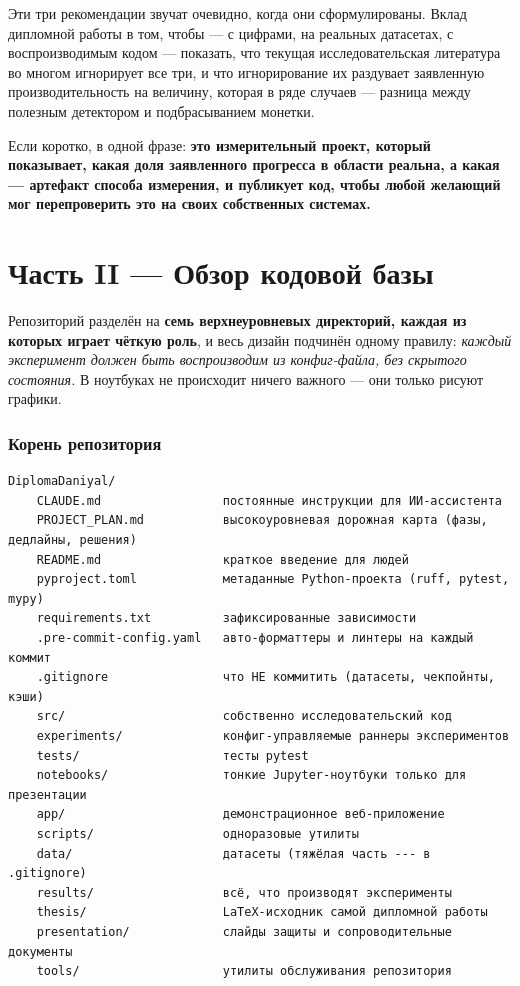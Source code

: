 \documentclass[11pt,a4paper]{article}
\begin{document}
Эти три рекомендации звучат очевидно, когда они сформулированы. Вклад дипломной работы в том, чтобы --- с цифрами, на реальных датасетах, с воспроизводимым кодом --- показать, что текущая исследовательская литература во многом игнорирует все три, и что игнорирование их раздувает заявленную производительность на величину, которая в ряде случаев --- разница между полезным детектором и подбрасыванием монетки.

Если коротко, в одной фразе: \textbf{это измерительный проект, который показывает, какая доля заявленного прогресса в области реальна, а какая --- артефакт способа измерения, и публикует код, чтобы любой желающий мог перепроверить это на своих собственных системах.}

\clearpage

\part*{Часть II --- Обзор кодовой базы}

Репозиторий разделён на \textbf{семь верхнеуровневых директорий, каждая из которых играет чёткую роль}, и весь дизайн подчинён одному правилу: \emph{каждый эксперимент должен быть воспроизводим из конфиг-файла, без скрытого состояния.} В ноутбуках не происходит ничего важного --- они только рисуют графики.

\section{Корень репозитория}

\begin{Verbatim}
DiplomaDaniyal/
    CLAUDE.md                 постоянные инструкции для ИИ-ассистента
    PROJECT_PLAN.md           высокоуровневая дорожная карта (фазы, дедлайны, решения)
    README.md                 краткое введение для людей
    pyproject.toml            метаданные Python-проекта (ruff, pytest, mypy)
    requirements.txt          зафиксированные зависимости
    .pre-commit-config.yaml   авто-форматтеры и линтеры на каждый коммит
    .gitignore                что НЕ коммитить (датасеты, чекпойнты, кэши)
    src/                      собственно исследовательский код
    experiments/              конфиг-управляемые раннеры экспериментов
    tests/                    тесты pytest
    notebooks/                тонкие Jupyter-ноутбуки только для презентации
    app/                      демонстрационное веб-приложение
    scripts/                  одноразовые утилиты
    data/                     датасеты (тяжёлая часть --- в .gitignore)
    results/                  всё, что производят эксперименты
    thesis/                   LaTeX-исходник самой дипломной работы
    presentation/             слайды защиты и сопроводительные документы
    tools/                    утилиты обслуживания репозитория
\end{Verbatim}
\end{document}
